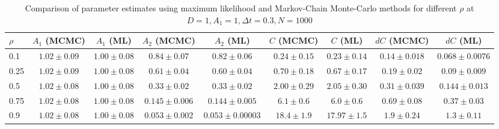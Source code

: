 \documentclass[%
 reprint,
 amsmath,amssymb,
 aps,
]{revtex4-1}
\begin{document}
\begin{table}
\begin{tabular}{l|c|c|c|c|c|c|c|c}
	\hline
	$\rho$     & $A_1$ (MCMC) & $A_1$ (ML) & $A_2$ (MCMC) & $A_2$ (ML) & $C$ (MCMC) &  $C$ (ML) & $dC$ (MCMC) &  $dC$ (ML)\\
	\hline
	0.1  & $1.02\pm0.09$ & $1.00\pm0.08$ & $0.84\pm0.07$ & $0.82\pm0.06$ & $0.24\pm0.15$ & $0.23\pm0.14$ & $0.14\pm0.018$  & $0.068\pm0.0076$ \\
	0.25 & $1.02\pm0.09$ & $1.00\pm0.08$ & $0.61\pm0.04$ & $0.60\pm0.04$ & $0.70\pm0.18$    & $0.67\pm0.17$   & $0.19\pm0.02$   & $0.09\pm0.009$\\
	0.5 & $1.02\pm0.08$  & $1.00\pm0.08$     & $0.33\pm0.02$    &  $0.33\pm0.02$   & $2.00\pm0.29$ & $2.05\pm0.30$ & $0.31\pm0.039$ & $0.144\pm0.013$ \\
	0.75  & $1.02\pm0.08$ & $1.00\pm0.08$ & $0.145\pm0.006$  & $0.144\pm0.005$ & $6.1\pm0.6$ & $6.0\pm0.6$ & $0.69\pm0.08$  & $0.37\pm0.03$\\
	0.9  & $1.02\pm0.08$ & $1.00\pm0.08$ & $0.053\pm0.002$ & $0.053\pm0.00003$ & $18.4\pm1.9$ & $17.97\pm1.5$ & $1.9\pm0.24$ & $1.3\pm0.11$\\
	\hline
\end{tabular}
\caption{Comparison of parameter estimates using maximum likelihood and Markov-Chain Monte-Carlo methods for different $\rho$ at $D=1,A_{1}=1,\Delta t = 0.3,N=1000$}
\label{simtable}
\end{table}
\end{document}
